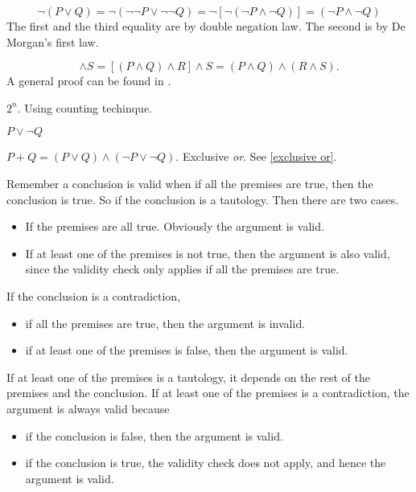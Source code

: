\begin{exx}
  \begin{equation*}
    \lnot(P\lor Q)=\lnot(\lnot\lnot P \lor \lnot\lnot Q)=\lnot[\lnot(\lnot P \land \lnot Q)]=(\lnot P \land \lnot Q)
  \end{equation*}
  The first and the third equality are by double negation law. The second is by De Morgan's first law.
\end{exx}

\begin{exx}
  \begin{equation*}
    [P\land(Q\land R)]\land S=[(P\land Q)\land R]\land S=(P\land Q)\land(R \land S).
  \end{equation*}
  A general proof can be found in \cite[p.~19, problem 24]{spivak08}.
\end{exx}

\begin{exx}
  $2^n$. Using counting techinque.
\end{exx}

\begin{exx}
  $P\lor \lnot Q$
\end{exx}

\begin{exx}
  $P+Q=(P\lor Q)\land(\lnot P \lor \lnot Q)$. Exclusive \textit{or}. See \autoref{exclusive or}.
\end{exx}

\begin{exx}
  Remember a conclusion is valid when if all the premises are true, then the conclusion is true.
  So if the conclusion is a tautology. Then there are two cases.
  \begin{itemize}
    \item If the premises are all true. Obviously the argument is valid.
    \item If at least one of the premises is not true, then the argument is also valid, since
    the validity check only applies if all the premises are true.
  \end{itemize}
  If the conclusion is a contradiction,
  \begin{itemize}
    \item if all the premises are true, then the argument is invalid.
    \item if at least one of the premises is false, then the argument is valid.
  \end{itemize}
  If at least one of the premises is a tautology, it depends on the rest of the premises and the conclusion.
  If at least one of the premises is a contradiction, the argument is always valid because
  \begin{itemize}
    \item if the conclusion is false, then the argument is valid.
    \item if the conclusion is true, the validity check does not apply, and hence the argument is valid.
  \end{itemize}
\end{exx}
